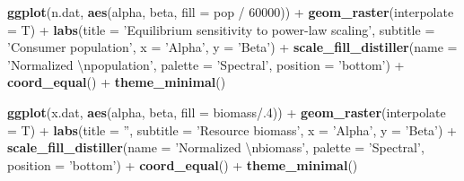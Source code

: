 \documentclass[]{article}
\newenvironment{Shaded}{}{}
\newcommand{\KeywordTok}[1]{\textcolor[rgb]{0.00,0.44,0.13}{\textbf{{#1}}}}
\newcommand{\DataTypeTok}[1]{\textcolor[rgb]{0.56,0.13,0.00}{{#1}}}
\newcommand{\DecValTok}[1]{\textcolor[rgb]{0.25,0.63,0.44}{{#1}}}
\newcommand{\CharTok}[1]{\textcolor[rgb]{0.25,0.44,0.63}{{#1}}}
\newcommand{\StringTok}[1]{\textcolor[rgb]{0.25,0.44,0.63}{{#1}}}
\newcommand{\NormalTok}[1]{{#1}}
\begin{document}
\begin{Shaded}
\begin{Highlighting}[]
\KeywordTok{ggplot}\NormalTok{(n.dat, }\KeywordTok{aes}\NormalTok{(alpha, beta, }\DataTypeTok{fill =} \NormalTok{pop /}\StringTok{ }\DecValTok{60000}\NormalTok{)) +}
\StringTok{  }\KeywordTok{geom_raster}\NormalTok{(}\DataTypeTok{interpolate =} \NormalTok{T) +}
\StringTok{  }\KeywordTok{labs}\NormalTok{(}\DataTypeTok{title =} \StringTok{'Equilibrium sensitivity to power-law scaling'}\NormalTok{, }\DataTypeTok{subtitle =} \StringTok{'Consumer population'}\NormalTok{, }\DataTypeTok{x =} \StringTok{'Alpha'}\NormalTok{, }\DataTypeTok{y =} \StringTok{'Beta'}\NormalTok{) +}
\StringTok{  }\KeywordTok{scale_fill_distiller}\NormalTok{(}\DataTypeTok{name =} \StringTok{'Normalized }\CharTok{\textbackslash{}n}\StringTok{population'}\NormalTok{, }\DataTypeTok{palette =} \StringTok{'Spectral'}\NormalTok{, }\DataTypeTok{position =} \StringTok{'bottom'}\NormalTok{) +}
\StringTok{  }\KeywordTok{coord_equal}\NormalTok{() +}
\StringTok{  }\KeywordTok{theme_minimal}\NormalTok{()}

\KeywordTok{ggplot}\NormalTok{(x.dat, }\KeywordTok{aes}\NormalTok{(alpha, beta, }\DataTypeTok{fill =} \NormalTok{biomass/.}\DecValTok{4}\NormalTok{)) +}
\StringTok{  }\KeywordTok{geom_raster}\NormalTok{(}\DataTypeTok{interpolate =} \NormalTok{T) +}
\StringTok{  }\KeywordTok{labs}\NormalTok{(}\DataTypeTok{title =} \StringTok{''}\NormalTok{, }\DataTypeTok{subtitle =} \StringTok{'Resource biomass'}\NormalTok{, }\DataTypeTok{x =} \StringTok{'Alpha'}\NormalTok{, }\DataTypeTok{y =} \StringTok{'Beta'}\NormalTok{) +}
\StringTok{  }\KeywordTok{scale_fill_distiller}\NormalTok{(}\DataTypeTok{name =} \StringTok{'Normalized }\CharTok{\textbackslash{}n}\StringTok{biomass'}\NormalTok{, }\DataTypeTok{palette =} \StringTok{'Spectral'}\NormalTok{, }\DataTypeTok{position =} \StringTok{'bottom'}\NormalTok{) +}
\StringTok{  }\KeywordTok{coord_equal}\NormalTok{() +}
\StringTok{  }\KeywordTok{theme_minimal}\NormalTok{()}
\end{Highlighting}
\end{Shaded}
\end{document}
